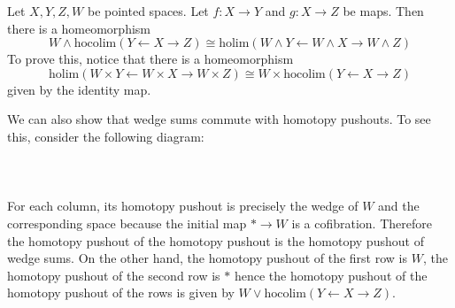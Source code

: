 \begin{eg}\label{prp:WedgeCommHPull} Let $X,Y,Z,W$ be pointed spaces. Let $f:X\to Y$ and $g:X\to Z$ be maps. Then there is a homeomorphism $$W\wedge\text{hocolim}(Y\leftarrow X\rightarrow Z)\cong\text{holim}(W\wedge Y\leftarrow W\wedge X\rightarrow W\wedge Z)$$ To prove this, notice that there is a homeomorphism $$\text{holim}(W\times Y\leftarrow W\times X\rightarrow W\times Z)\cong W\times\text{hocolim}(Y\leftarrow X\rightarrow Z)$$ given by the identity map. 

We can also show that wedge sums commute with homotopy pushouts. To see this, consider the following diagram: \\~\\
\\~\\
For each column, its homotopy pushout is precisely the wedge of $W$ and the corresponding space because the initial map $\ast\to W$ is a cofibration. Therefore the homotopy pushout of the homotopy pushout is the homotopy pushout of wedge sums. On the other hand, the homotopy pushout of the first row is $W$, the homotopy pushout of the second row is $\ast$ hence the homotopy pushout of the homotopy pushout of the rows is given by $W\vee\text{hocolim}(Y\leftarrow X\rightarrow Z)$. 


\end{eg}
